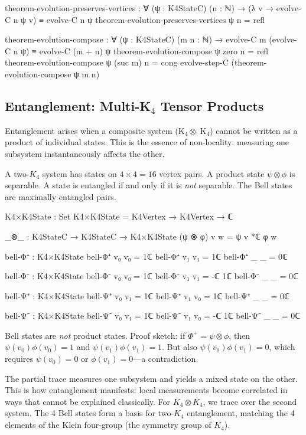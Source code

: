 \documentclass[11pt,a4paper]{book}
\begin{document}
\begin{code}
theorem-evolution-preserves-vertices : ∀ (ψ : K4StateC) (n : ℕ) →
  (λ v → evolve-C n ψ v) ≡ evolve-C n ψ
theorem-evolution-preserves-vertices ψ n = refl

theorem-evolution-compose : ∀ (ψ : K4StateC) (m n : ℕ) →
  evolve-C m (evolve-C n ψ) ≡ evolve-C (m + n) ψ
theorem-evolution-compose ψ zero    n = refl
theorem-evolution-compose ψ (suc m) n = cong evolve-step-C (theorem-evolution-compose ψ m n)
\end{code}

\subsection[Entanglement: Multi-K4 Tensor Products]{Entanglement: Multi-K$_4$ Tensor Products}

Entanglement arises when a composite system (K$_4 \otimes$ K$_4$) cannot 
be written as a product of individual states. This is the essence of 
non-locality: measuring one subsystem instantaneously affects the other.

A two-$K_4$ system has states on $4 \times 4 = 16$ vertex pairs. A product state $\psi \otimes \phi$ is separable. A state is entangled if and only if it is \emph{not} separable. The Bell states are maximally entangled pairs.

\begin{code}
K4×K4State : Set
K4×K4State = K4Vertex → K4Vertex → ℂ

_⊗_ : K4StateC → K4StateC → K4×K4State
(ψ ⊗ φ) v w = ψ v *ℂ φ w

bell-Φ⁺ : K4×K4State
bell-Φ⁺ v₀ v₀ = 1ℂ
bell-Φ⁺ v₁ v₁ = 1ℂ
bell-Φ⁺ _  _  = 0ℂ

bell-Φ⁻ : K4×K4State
bell-Φ⁻ v₀ v₀ = 1ℂ
bell-Φ⁻ v₁ v₁ = -ℂ 1ℂ
bell-Φ⁻ _  _  = 0ℂ

bell-Ψ⁺ : K4×K4State
bell-Ψ⁺ v₀ v₁ = 1ℂ
bell-Ψ⁺ v₁ v₀ = 1ℂ
bell-Ψ⁺ _  _  = 0ℂ

bell-Ψ⁻ : K4×K4State
bell-Ψ⁻ v₀ v₁ = 1ℂ
bell-Ψ⁻ v₁ v₀ = -ℂ 1ℂ
bell-Ψ⁻ _  _  = 0ℂ
\end{code}

Bell states are \emph{not} product states. Proof sketch: if $\Phi^+ = \psi \otimes \phi$, then $\psi(v_0)\phi(v_0) = 1$ and $\psi(v_1)\phi(v_1) = 1$. But also $\psi(v_0)\phi(v_1) = 0$, which requires $\psi(v_0) = 0$ or $\phi(v_1) = 0$---a contradiction.

The partial trace measures one subsystem and yields a mixed state on the other. This is how entanglement manifests: local measurements become correlated in ways that cannot be explained classically. For $K_4 \otimes K_4$, we trace over the second system. The 4 Bell states form a basis for two-$K_4$ entanglement, matching the 4 elements of the Klein four-group (the symmetry group of $K_4$).
\end{document}
